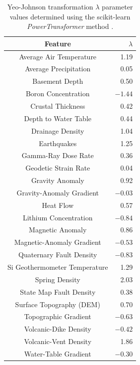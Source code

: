 \begin{table}[htp]
\centering
\begin{tabular}{|c|r|}
\hline
\textbf{Feature} & \textbf{$\lambda$} \\ \hline
Average Air Temperature & 1.19 \\ \hline
Average Precipitation & 0.05 \\ \hline
Basement Depth & 0.50 \\ \hline
Boron Concentration & $-1.44$ \\ \hline
Crustal Thickness & 0.42 \\ \hline
Depth to Water Table & 0.44 \\ \hline
Drainage Density & 1.04 \\ \hline
Earthquakes & 1.25 \\ \hline
Gamma-Ray Dose Rate & 0.36 \\ \hline
Geodetic Strain Rate & 0.04 \\ \hline
Gravity Anomaly & 0.92 \\ \hline
Gravity-Anomaly Gradient & $-0.03$ \\ \hline
Heat Flow & 0.57 \\ \hline
Lithium Concentration & $-0.84$ \\ \hline
Magnetic Anomaly & 0.86 \\ \hline
Magnetic-Anomaly Gradient & $-0.53$ \\ \hline
Quaternary Fault Density & $-0.83$ \\ \hline
Si Geothermometer Temperature & 1.29 \\ \hline
Spring Density & 2.03 \\ \hline
State Map Fault Density & 0.38 \\ \hline
Surface Topography (DEM) & 0.70 \\ \hline
Topographic Gradient & $-0.63$ \\ \hline
Volcanic-Dike Density & $-0.42$ \\ \hline
Volcanic-Vent Density & 1.86 \\ \hline
Water-Table Gradient & $-0.30$ \\ \hline
\end{tabular}
\caption[Yeo-Johnson transformation lambda values]{Yeo-Johnson transformation $\lambda$ parameter values determined using the scikit-learn \textit{PowerTransformer} method \protect\citep{scikit-learn_sklearnpreprocessingpowertransformer_2021}.}
\label{tab:yeo_lambdas}
\end{table}

